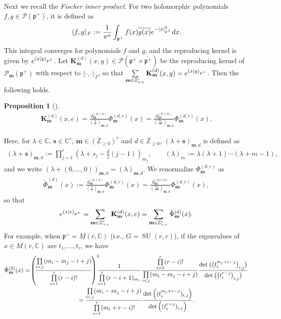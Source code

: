 \documentclass[11pt]{article}
\numberwithin{equation}{section}
\newtheorem{Proposition}[Theorem]{Proposition}
{ \theoremstyle{definition}
\newtheorem{Definition}[Theorem]{Definition}
\newtheorem{Note}[Theorem]{Note}
\newtheorem{Example}[Theorem]{Example}
\newtheorem{Remark}[Theorem]{Remark} }
\newcommand{\bK}{\mathbf{K}}
\newcommand{\bm}{\mathbf{m}}
\newcommand{\bs}{\mathbf{s}}
\newcommand{\BZ}{\mathbb{Z}}
\newcommand{\BC}{\mathbb{C}}
\newcommand{\fp}{\mathfrak{p}}
\newcommand{\cP}{\mathcal{P}}
\newcommand{\rT}{\mathrm{T}}
\begin{document}
Next we recall the \textit{Fischer inner product}.
For two holomorphic polynomials $f,g\in\cP(\fp^+)$, it is defined as
\begin{gather}\label{Fischer}
\langle f,g\rangle_F:=\frac{1}{\pi^n}\int_{\fp^+}f(x)\overline{g(x)} {\rm e}^{-|x|_{\fp^+}^2}{\rm d}x.
\end{gather}
This integral converges for polynomials $f$ and $g$, and the reproducing kernel is given by ${\rm e}^{(x|y)_{\fp^+}}$.
Let $\bK_\bm^{(d)}(x,y)\in\cP(\fp^+\times\overline{\fp^+})$ be the reproducing kernel of $\cP_\bm(\fp^+)$
with respect to $\langle\cdot,\cdot\rangle_F$, so that $\sum\limits_{\bm\in\BZ_{++}^r}\bK_\bm^{(d)}(x,y)={\rm e}^{(x|y)_{\fp^+}}$. Then the following holds.
\begin{Proposition}[{\cite[Part III, Lemma V.3.1(a), Theorem V.3.4]{FKKLR}}]\label{Kmxe}
\begin{gather*} \bK_\bm^{(d)}(x,e)=\frac{d_\bm^{(d,r,b)}}{\left(\frac{n}{r}\right)_{\bm,d}}\Phi_\bm^{(d,r)}(x)
=\frac{d_\bm^{(d,r,0)}}{\left(\frac{n_\rT}{r}\right)_{\bm,d}}\Phi_\bm^{(d,r)}(x). \end{gather*}
\end{Proposition}
Here, for $\lambda\in\BC$, $\bs\in\BC^r$, $\bm\in(\BZ_{\ge 0})^r$ and $d\in\BZ_{\ge 0}$, $(\lambda+\bs)_{\bm,d}$ is defined as
\begin{gather}\label{Pochhammer}
(\lambda+\bs)_{\bm,d}:=\prod_{j=1}^r\left(\lambda+s_j-\frac{d}{2}(j-1)\right)_{m_j},\qquad
(\lambda)_m:=\lambda(\lambda+1)\cdots(\lambda+m-1),
\end{gather}
and we write $(\lambda+(0,\ldots,0))_{\bm,d}=(\lambda)_{\bm,d}$.
We renormalize $\Phi_\bm^{(d,r)}$ as
\begin{gather}\label{Phitilde1}
\tilde{\Phi}_\bm^{(d)}(x):=\frac{d_\bm^{(d,r,b)}}{\left(\frac{n}{r}\right)_{\bm,d}}\Phi_\bm^{(d,r)}(x)
=\frac{d_\bm^{(d,r,0)}}{\left(\frac{n_\rT}{r}\right)_{\bm,d}}\Phi_\bm^{(d,r)}(x),
\end{gather}
so that
\begin{gather*} {\rm e}^{(x|e)_{\fp^+}}=\sum_{\bm\in\BZ_{++}^r}\bK_\bm^{(d)}(x,e)=\sum_{\bm\in\BZ_{++}^r}\tilde{\Phi}_\bm^{(d)}(x). \end{gather*}
For example, when $\fp^+=M(r,\BC)$ (i.e., $G=\operatorname{SU}(r,r)$), if the eigenvalues of $x\in M(r,\BC)$ are $t_1,\ldots,t_r$, we have
\begin{gather}
\tilde{\Phi}_\bm^{(2)}(x) = \!\left(\!\frac{\prod\limits_{i<j}(m_i-m_j-i+j)}{\prod\limits_{i=1}^r (r-i)!}\!\right)^2\!\!\! \frac{1}{\prod\limits_{i=1}^r (r-i+1)_{m_i}}
 \frac{\prod\limits_{i=1}^r (r-i)!}{\prod\limits_{i<j}(m_i-m_j-i+j)}
\frac{\det\big(\big(t_i^{m_j+r-j}\big)_{i,j}\big)}{\det\big(\big(t_i^{r-j}\big)_{i,j}\big)}\notag \\
\hphantom{\tilde{\Phi}_\bm^{(2)}(x)}{} =\frac{\prod\limits_{i<j}(m_i-m_j-i+j)}{\prod\limits_{i=1}^r (m_i+r-i)!}
\frac{\det\left((t_i^{m_j+r-j})_{i,j}\right)}{\det\left((t_i^{r-j})_{i,j}\right)}.\label{Schur}
\end{gather}
\end{document}
